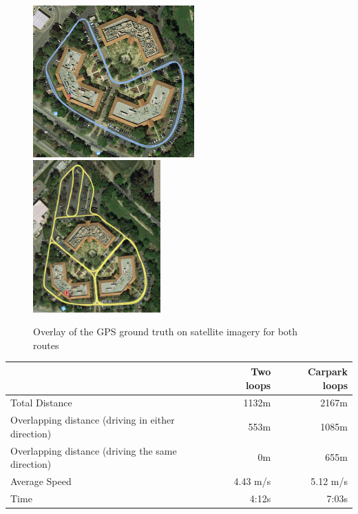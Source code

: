 \begin{figure}[h]
  \centering
    \includegraphics[width=0.553\textwidth]{chapters/images/two_loops_overlay}
    \includegraphics[width=0.437\textwidth]{chapters/images/carpark_loops_overlay}
  \caption{Overlay of the GPS ground truth on satellite imagery for both routes}
\end{figure}

\begin{table}[h]
    \begin{tabular}{ p{8.5cm} r r} %
    \toprule
    & Two loops & Carpark loops \\
    \midrule
    Total Distance & 1132m & 2167m \\
    Overlapping distance (driving in either direction)& 553m & 1085m \\
    Overlapping distance (driving the same direction)& 0m & 655m \\
    Average Speed & 4.43 m/s & 5.12 m/s \\
    Time & 4:12s & 7:03s \\
    \bottomrule
    \end{tabular}
  \label{tab:geometry}
\end{table}

